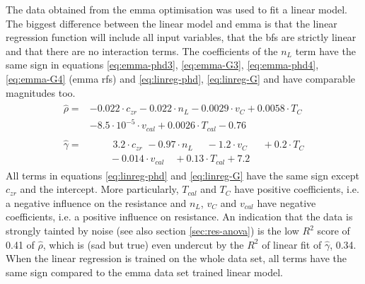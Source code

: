 The data obtained from the \gls{emma} optimisation was used to fit a linear model. 
The biggest difference between the linear model and \gls{emma} is that the linear regression function will include all input variables, that the \gls{bf}s are strictly linear and that there are no interaction terms. 
The coefficients of the $n_L$ term have the same sign in equations \ref{eq:emma-phd3}, \ref{eq:emma-G3}, \ref{eq:emma-phd4}, \ref{eq:emma-G4} (\gls{emma} \gls{rf}s) and \ref{eq:linreg-phd}, \ref{eq:linreg-G} and have comparable magnitudes too. 
%
%
\begin{align}
	\begin{split}
		\label{eq:linreg-phd}
		\hat{\rho} =&  -0.022\cdot c_{zr} -0.022\cdot n_L -0.0029\cdot v_{C} + 0.0058\cdot T_{C} \\
		& -8.5\cdot 10^{-5}\cdot v_{cal} + 0.0026\cdot T_{cal} -0.76
	\end{split}
	\\
	\begin{split}
		\label{eq:linreg-G}
		\hat{\gamma} =&  \,\,\qquad 3.2\cdot c_{zr} \,\, - 0.97\cdot n_L \,\,\quad - 1.2\cdot v_{C}  \,\,\,\quad +0.2\cdot T_{C} \\
			& \qquad - 0.014\cdot v_{cal} \quad + 0.13\cdot T_{cal} + 7.2
	\end{split}
\end{align}
%
All terms in equations \ref{eq:linreg-phd} and \ref{eq:linreg-G} have the same sign 
except $c_{zr}$ and the intercept. 
%
More particularly, $T_{cal}$ and $T_{C}$ have positive coefficients, i.e. a negative influence on the resistance 
and $n_L$, $v_{C}$ and $v_{cal}$ have negative coefficients, i.e. a positive influence on resistance. 
An indication that the data is strongly tainted by noise (see also section \ref{sec:res-anova}) is the low $R^2$ score of 0.41 of $\hat\rho$, 
which is (sad but true) even undercut by the $R^2$ of linear fit of $\hat\gamma$, 0.34. 
When the linear regression is trained on the whole data set, all terms have the same sign compared to the \gls{emma} data set trained linear model. 
